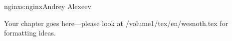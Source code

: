 \begin{aosachapter}{nginx}{s:nginx}{Andrey Alexeev}

Your chapter goes here---please look at /volume1/tex/en/wesnoth.tex for 
formatting ideas.

\end{aosachapter}

